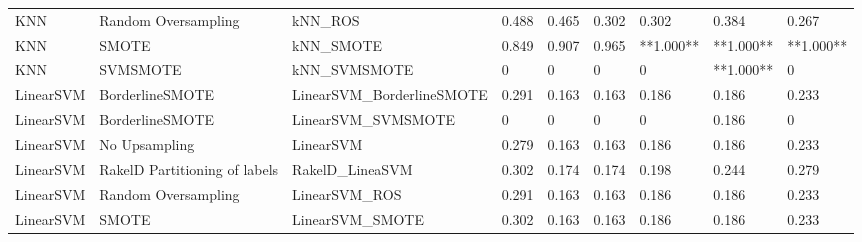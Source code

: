 \begin{tabular}{lllllllll}
                            KNN &           Random Oversampling &                                      kNN\_ROS & 0.488 &                     0.465 &                 0.302 &                  0.302 &                                   0.384 &     0.267 \\
                            KNN &                         SMOTE &                                    kNN\_SMOTE & 0.849 &                     0.907 &                 0.965 &              **1.000** &                               **1.000** & **1.000** \\
                            KNN &                      SVMSMOTE &                                 kNN\_SVMSMOTE &     0 &                         0 &                     0 &                      0 &                               **1.000** &         0 \\
                      LinearSVM &               BorderlineSMOTE &                    LinearSVM\_BorderlineSMOTE & 0.291 &                     0.163 &                 0.163 &                  0.186 &                                   0.186 &     0.233 \\
                      LinearSVM &               BorderlineSMOTE &                           LinearSVM\_SVMSMOTE &     0 &                         0 &                     0 &                      0 &                                   0.186 &         0 \\
                      LinearSVM &                 No Upsampling &                                    LinearSVM & 0.279 &                     0.163 &                 0.163 &                  0.186 &                                   0.186 &     0.233 \\
                      LinearSVM & RakelD Partitioning of labels &                              RakelD\_LineaSVM & 0.302 &                     0.174 &                 0.174 &                  0.198 &                                   0.244 &     0.279 \\
                      LinearSVM &           Random Oversampling &                                LinearSVM\_ROS & 0.291 &                     0.163 &                 0.163 &                  0.186 &                                   0.186 &     0.233 \\
                      LinearSVM &                         SMOTE &                              LinearSVM\_SMOTE & 0.302 &                     0.163 &                 0.163 &                  0.186 &                                   0.186 &     0.233 \\

\end{tabular}
